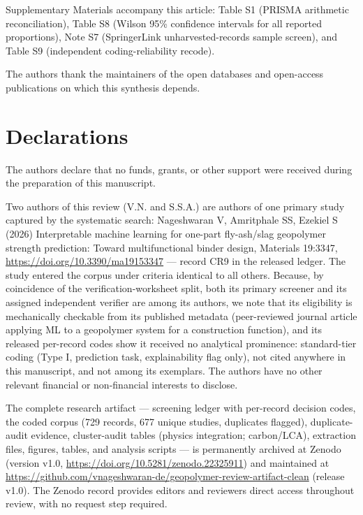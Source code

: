 \documentclass[pdflatex,sn-basic]{sn-jnl}
\begin{document}
\backmatter

Supplementary Materials accompany this article: Table S1 (PRISMA arithmetic reconciliation), Table S8 (Wilson 95\% confidence intervals for all reported proportions), Note S7 (SpringerLink unharvested-records sample screen), and Table S9 (independent coding-reliability recode).

The authors thank the maintainers of the open databases and open-access publications on which this synthesis depends.

\section*{Declarations}

The authors declare that no funds, grants, or other support were received during the preparation of this manuscript.

Two authors of this review (V.N. and S.S.A.) are authors of one primary study captured by the systematic search: Nageshwaran V, Amritphale SS, Ezekiel S (2026) Interpretable machine learning for one-part fly-ash/slag geopolymer strength prediction: Toward multifunctional binder design, Materials 19:3347, \url{https://doi.org/10.3390/ma19153347} --- record CR9 in the released ledger. The study entered the corpus under criteria identical to all others. Because, by coincidence of the verification-worksheet split, both its primary screener and its assigned independent verifier are among its authors, we note that its eligibility is mechanically checkable from its published metadata (peer-reviewed journal article applying ML to a geopolymer system for a construction function), and its released per-record codes show it received no analytical prominence: standard-tier coding (Type I, prediction task, explainability flag only), not cited anywhere in this manuscript, and not among its exemplars. The authors have no other relevant financial or non-financial interests to disclose.

The complete research artifact --- screening ledger with per-record decision codes, the coded corpus (729 records, 677 unique studies, duplicates flagged), duplicate-audit evidence, cluster-audit tables (physics integration; carbon/LCA), extraction files, figures, tables, and analysis scripts --- is permanently archived at Zenodo (version v1.0, \url{https://doi.org/10.5281/zenodo.22325911}) and maintained at \url{https://github.com/vnageshwaran-de/geopolymer-review-artifact-clean} (release v1.0). The Zenodo record provides editors and reviewers direct access throughout review, with no request step required.
\end{document}
